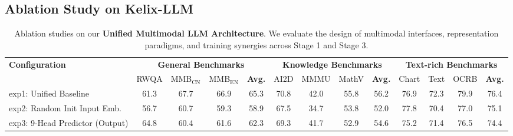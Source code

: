 \documentclass[11pt, a4paper, logo, copyright]{googledeepmind}
\begin{document}
\subsection{Ablation Study on Kelix-LLM}
\begin{table}[t]
    \centering
    \scriptsize 
    \setlength{\tabcolsep}{2.5pt} 
    \renewcommand{\arraystretch}{1.25} 
    
    \caption{
        Ablation studies on our \textbf{Unified Multimodal LLM Architecture}. 
        We evaluate the design of multimodal interfaces, representation paradigms, and training synergies across Stage 1 and Stage 3. 
    }
    \label{tab:ablation_unified_model}
    
    \begin{tabular}{
        @{} l  
        cccc       %
        cccc       %
        cccc       %
        @{}
    }
        \toprule
        \multirow{2.5}{*}{\textbf{Configuration}} & 
        \multicolumn{4}{c}{\textbf{General Benchmarks}} & 
        \multicolumn{4}{c}{\textbf{Knowledge Benchmarks}} & 
        \multicolumn{4}{c}{\textbf{Text-rich Benchmarks}} \\
        
        \cmidrule(r){2-5} \cmidrule(lr){6-9} \cmidrule(l){10-13}
        
        & RWQA & MMB$_\text{CN}$ & MMB$_\text{EN}$ & \multicolumn{1}{c}{\textbf{Avg.}} 
        & AI2D & MMMU & MathV & \multicolumn{1}{c}{\textbf{Avg.}}
        & Chart & Text & OCRB & \multicolumn{1}{c}{\textbf{Avg.}} \\
        \midrule
        
        exp1: Unified Baseline
        & 61.3 & 67.7 & 66.9 & 65.3 &
        70.8	& 42.0 &	55.8 &	56.2 &
        76.9 &	72.3	& 79.9 &	76.4 \\
        \rowcolor{colA}
        exp2: Random Init Input Emb.
        & 56.7 &	60.7&	59.3&	58.9	
        &67.5&	34.7&	53.8&	52.0	
        &77.8	&70.4&	77.0 &	75.1 \\
        \rowcolor{colA}
        exp3: 9-Head Predictor (Output)
        & 64.8	&60.4	&61.6	&62.3 
        &	69.3	&41.7&	52.9 &	54.6 
        &	75.2 &	71.4 &	76.5 &	74.4  \\

        \bottomrule
    \end{tabular}
\end{table}
\end{document}
